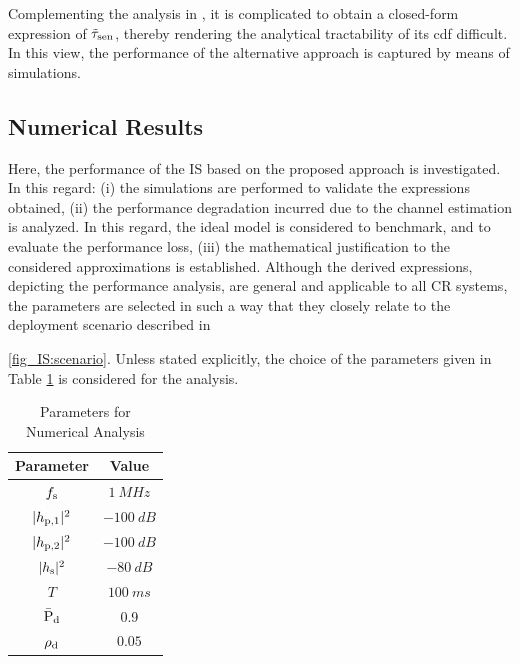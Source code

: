 \begin{remark} \label{rm:rem2}
\normalfont
Complementing the analysis in \cite{Liang08}, it is complicated to obtain a closed-form expression of $\tilde{\tau}_{\text{sen}}$, thereby rendering the analytical tractability of its cdf difficult. In this view, the performance of the alternative approach is captured by means of simulations.
\end{remark}


\subsection{Numerical Results} \label{sec_IS:num_ana}
Here, the performance of the IS based on the proposed approach is investigated. In this regard: (i) the simulations are performed to validate the expressions obtained, (ii) the performance degradation incurred due to the channel estimation is analyzed. In this regard, the ideal model is considered to benchmark, and to evaluate the performance loss, (iii) the mathematical justification to the considered approximations is established. Although the derived expressions, depicting the performance analysis, are general and applicable to all CR systems, the parameters are selected in such a way that they closely relate to the deployment scenario described in \figurename~{\ref{fig_IS:scenario}. Unless stated explicitly, the choice of the parameters given in Table \ref{tb_IS:tb2} is considered for the analysis.
\begin{table}
\renewcommand{\arraystretch}{1.4}
\caption{Parameters for Numerical Analysis}
\label{tb_IS:tb2}
\centering
\begin{tabular}{c||c}
\hline
\bfseries Parameter & \bfseries Value \\
\hline\hline
$f_{\text{s}}$  & $\SI{1}{MHz}$ \\ %
$|h_{\text{p,1}}|^2$  & $\SI{-100}{dB}$ \\ %
$|h_{\text{p,2}}|^2$  & $\SI{-100}{dB}$ \\ %
$|h_{\text{s}}|^2$  & $\SI{-80}{dB}$ \\ %
$T$ & $\SI{100}{ms}$ \\ %
$\bar{\text{P}}_{\text{d}}$ & 0.9 \\ %
$\rho_{\text{d}}$ & $0.05$ \\ %

\end{tabular}
\end{table}}

